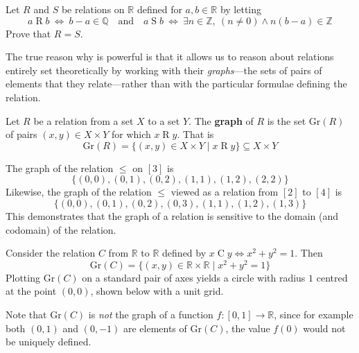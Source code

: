 \begin{exercise}
Let $R$ and $S$ be relations on $\mathbb{R}$ defined for $a,b \in \mathbb{R}$ by letting
\[ a \mathrel{R} b ~ \Leftrightarrow ~ b-a \in \mathbb{Q} \quad \text{and} \quad a \mathrel{S} b ~ \Leftrightarrow ~ \exists n \in \mathbb{Z},~ (n \ne 0) \wedge n(b-a) \in \mathbb{Z} \]
Prove that $R=S$.
\end{exercise}

The true reason why  is powerful is that it allows us to reason about relations entirely set theoretically by working with their \textit{graphs}---the sets of pairs of elements that they relate---rather than with the particular formulae defining the relation.

\begin{definition}
\label{defRelationGraph}
Let $R$ be a relation from a set $X$ to a set $Y$. The \textbf{graph} of $R$ is the set $\mathrm{Gr}(R)$  of pairs $(x,y) \in X \times Y$ for which $x \mathrel{R} y$. That is
\[ \mathrm{Gr}(R) = \{ (x,y) \in X \times Y \mid x \mathrel{R} y \} \subseteq X \times Y \]
\end{definition}

\begin{example}
The graph of the relation $\le$ on $[3]$ is
\[ \{ (0,0), (0,1), (0,2), (1,1), (1,2), (2,2) \} \]
Likewise, the graph of the relation $\le$ viewed as a relation from $[2]$ to $[4]$ is
\[ \{ (0,0), (0,1), (0,2), (0,3), (1,1), (1,2), (1,3) \} \]
This demonstrates that the graph of a relation is sensitive to the domain (and codomain) of the relation.
\end{example}

\begin{example}
\label{exCircleRelation}
Consider the relation $C$ from $\mathbb{R}$ to $\mathbb{R}$ defined by $x \mathrel{C} y \Leftrightarrow x^2+y^2=1$. Then
\[ \mathrm{Gr}(C) = \{ (x,y) \in \mathbb{R} \times \mathbb{R} \mid x^2+y^2=1 \} \]
Plotting $\mathrm{Gr}(C)$ on a standard pair of axes yields a circle with radius $1$ centred at the point $(0,0)$, shown below with a unit grid.
\begin{center}
\end{center}
Note that $\mathrm{Gr}(C)$ is \textit{not} the graph of a function $f : [0,1] \to \mathbb{R}$, since for example both $(0,1)$ and $(0,{-1})$ are elements of $\mathrm{Gr}(C)$, the value $f(0)$ would not be uniquely defined.
\end{example}

